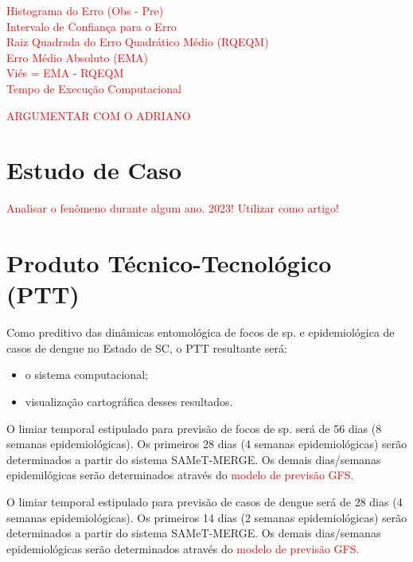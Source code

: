 \indent \textcolor{red}{Histograma do Erro (Obs - Pre)\\
\indent Intervalo de Confiança para o Erro\\
\indent Raiz Quadrada do Erro Quadrático Médio (RQEQM)\\
\indent Erro Médio Absoluto (EMA)\\
\indent Viés = EMA - RQEQM\\
\indent Tempo de Execução Computacional}

\indent \textcolor{red}{ARGUMENTAR COM O ADRIANO}
 
\section{Estudo de Caso}

\indent \textcolor{red}{Analisar o fenômeno durante algum ano. 2023! Utilizar como artigo!}

\section{Produto Técnico-Tecnológico (PTT)} 

\indent Como preditivo das dinâmicas entomológica de focos de  sp. e epidemiológica de casos de dengue no Estado de \acrlong{SC}, o \acrshort{PTT} resultante será:

\begin{itemize}
  \item o sistema computacional;
  \item visualização cartográfica desses resultados.
\end{itemize}

\indent O limiar temporal estipulado para previsão de focos de  sp. será de 56 dias (8 semanas epidemiológicas). Os primeiros 28 dias (4 semanas epidemiológicas) serão determinados a partir do sistema \acrshort{SAMeT}-\acrshort{MERGE}. Os demais dias/semanas epidemilógicas serão determinados através do \textcolor{red}{modelo de previsão \acrshort{GFS}.}

\indent O limiar temporal estipulado para previsão de casos de dengue será de 28 dias (4 semanas epidemiológicas). Os primeiros 14 dias (2 semanas epidemiológicas) serão determinados a partir do sistema \acrshort{SAMeT}-\acrshort{MERGE}. Os demais dias/semanas epidemiológicas serão determinados através do \textcolor{red}{modelo de previsão \acrshort{GFS}.}




